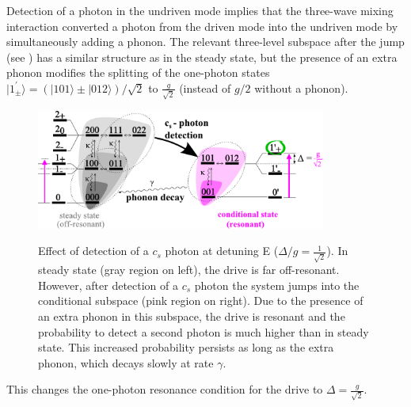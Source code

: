 Detection of a photon in the undriven mode
implies that the three-wave mixing interaction
converted a photon from the driven mode into
the undriven mode by simultaneously adding a phonon.
The relevant three-level subspace after the jump 
(see ) has a similar structure as in the steady state, 
but the presence of an extra phonon
modifies the splitting of the one-photon 
states $|1^\prime_{\pm}\rangle=(|101\rangle \pm |012\rangle)/\sqrt{2}$  to
$\frac{g}{\sqrt{2}}$ 
(instead of $g/2$ without a phonon).
%
\begin{figure}[htb]
\centering  
  \includegraphics[width=0.85\textwidth]{./figs_Komar2013/fig7.pdf}\\
  \caption[Diagram of the metastable subspace]
  {
  \label{fig:levels_jumps}
  Effect of detection of a $c_s$ photon
  at detuning E ($\Delta/g = \frac{1}{\sqrt{2}}$).
  In steady state (gray region on left), 
  the drive is far off-resonant.
  However, after detection of a $c_s$ photon the system
  jumps into the conditional subspace (pink region on right).
  Due to the presence of an extra phonon in this subspace,
  the drive is resonant and the probability to detect a second
  photon is much higher than in steady state.
  This increased probability persists
  as long as the extra phonon,
  which decays slowly at rate $\gamma$.
  }
\end{figure}
This changes
the one-photon resonance condition
for the drive to $\Delta = \frac{g}{\sqrt{2}}$.
